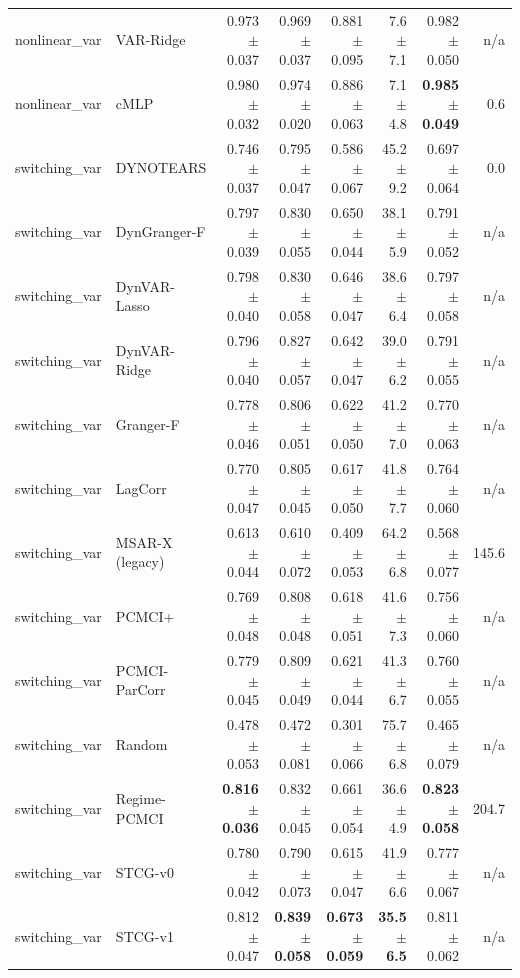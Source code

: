 \begin{tabular}{llrrrrrr}
nonlinear\_var & VAR-Ridge & 0.973 $\pm$ 0.037 & 0.969 $\pm$ 0.037 & 0.881 $\pm$ 0.095 & 7.6 $\pm$ 7.1 & 0.982 $\pm$ 0.050 & n/a \\
nonlinear\_var & cMLP & 0.980 $\pm$ 0.032 & 0.974 $\pm$ 0.020 & 0.886 $\pm$ 0.063 & 7.1 $\pm$ 4.8 & \textbf{0.985 $\pm$ 0.049} & 0.6 \\
\midrule
switching\_var & DYNOTEARS & 0.746 $\pm$ 0.037 & 0.795 $\pm$ 0.047 & 0.586 $\pm$ 0.067 & 45.2 $\pm$ 9.2 & 0.697 $\pm$ 0.064 & 0.0 \\
switching\_var & DynGranger-F & 0.797 $\pm$ 0.039 & 0.830 $\pm$ 0.055 & 0.650 $\pm$ 0.044 & 38.1 $\pm$ 5.9 & 0.791 $\pm$ 0.052 & n/a \\
switching\_var & DynVAR-Lasso & 0.798 $\pm$ 0.040 & 0.830 $\pm$ 0.058 & 0.646 $\pm$ 0.047 & 38.6 $\pm$ 6.4 & 0.797 $\pm$ 0.058 & n/a \\
switching\_var & DynVAR-Ridge & 0.796 $\pm$ 0.040 & 0.827 $\pm$ 0.057 & 0.642 $\pm$ 0.047 & 39.0 $\pm$ 6.2 & 0.791 $\pm$ 0.055 & n/a \\
switching\_var & Granger-F & 0.778 $\pm$ 0.046 & 0.806 $\pm$ 0.051 & 0.622 $\pm$ 0.050 & 41.2 $\pm$ 7.0 & 0.770 $\pm$ 0.063 & n/a \\
switching\_var & LagCorr & 0.770 $\pm$ 0.047 & 0.805 $\pm$ 0.045 & 0.617 $\pm$ 0.050 & 41.8 $\pm$ 7.7 & 0.764 $\pm$ 0.060 & n/a \\
switching\_var & MSAR-X (legacy) & 0.613 $\pm$ 0.044 & 0.610 $\pm$ 0.072 & 0.409 $\pm$ 0.053 & 64.2 $\pm$ 6.8 & 0.568 $\pm$ 0.077 & 145.6 \\
switching\_var & PCMCI+ & 0.769 $\pm$ 0.048 & 0.808 $\pm$ 0.048 & 0.618 $\pm$ 0.051 & 41.6 $\pm$ 7.3 & 0.756 $\pm$ 0.060 & n/a \\
switching\_var & PCMCI-ParCorr & 0.779 $\pm$ 0.045 & 0.809 $\pm$ 0.049 & 0.621 $\pm$ 0.044 & 41.3 $\pm$ 6.7 & 0.760 $\pm$ 0.055 & n/a \\
switching\_var & Random & 0.478 $\pm$ 0.053 & 0.472 $\pm$ 0.081 & 0.301 $\pm$ 0.066 & 75.7 $\pm$ 6.8 & 0.465 $\pm$ 0.079 & n/a \\
switching\_var & Regime-PCMCI & \textbf{0.816 $\pm$ 0.036} & 0.832 $\pm$ 0.045 & 0.661 $\pm$ 0.054 & 36.6 $\pm$ 4.9 & \textbf{0.823 $\pm$ 0.058} & 204.7 \\
switching\_var & STCG-v0 & 0.780 $\pm$ 0.042 & 0.790 $\pm$ 0.073 & 0.615 $\pm$ 0.047 & 41.9 $\pm$ 6.6 & 0.777 $\pm$ 0.067 & n/a \\
switching\_var & STCG-v1 & 0.812 $\pm$ 0.047 & \textbf{0.839 $\pm$ 0.058} & \textbf{0.673 $\pm$ 0.059} & \textbf{35.5 $\pm$ 6.5} & 0.811 $\pm$ 0.062 & n/a \\

\end{tabular}

